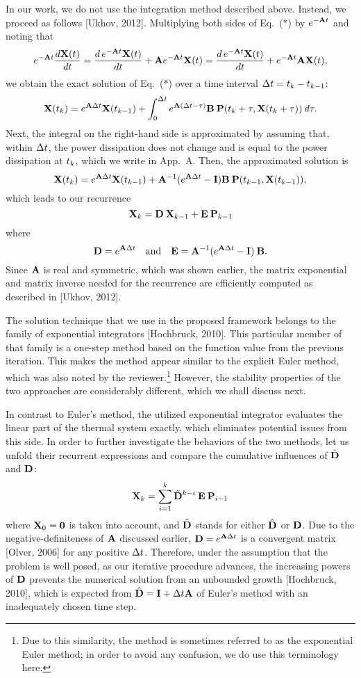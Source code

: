 \begin{authors}
In our work, we do not use the integration method described above.
Instead, we proceed as follows [Ukhov, 2012].
Multiplying both sides of Eq.~($\ast$) by $e^{- \mA \t}$ and noting that
\[
  e^{-\mA \t} \frac{d\vX(\t)}{d\t} = \frac{d\, e^{-\mA \t} \vX(\t)}{d\t} + \mA e^{-\mA \t} \vX(\t) = \frac{d\, e^{-\mA \t} \vX(\t)}{d\t} + e^{-\mA \t} \mA \vX(\t),
\]
we obtain the exact solution of Eq.~($\ast$) over a time interval $\Delta t = t_k - t_{k - 1}$:
\[
  \vX(\t_k) = e^{\mA \Delta \t} \vX(\t_{k - 1}) + \int_0^{\Delta \t} e^{\mA (\Delta t - \tau)} \mB \: \vP(\t_k + \tau, \vX(\t_k + \tau)) \: d\tau.
\]
Next, the integral on the right-hand side is approximated by assuming that, within $\Delta t$, the power dissipation does not change and is equal to the power dissipation at $t_k$, which we write in App.~A.
Then, the approximated solution is
\[
  \vX(\t_k) = e^{\mA \Delta \t} \vX(\t_{k - 1}) + \mA^{-1}(e^{\mA \Delta \t} - \mI) \mB \: \vP(\t_{k - 1}, \vX(\t_{k - 1})),
\]
which leads to our recurrence
\[
  \vX_k = \mCF \: \vX_{k - 1} + \mCS \: \vP_{k - 1}
\]
where
\[
  \mCF = e^{\mA \Delta t} \hspace{1em} \text{and} \hspace{1em} \mCS = \mA^{-1} (e^{\mA \Delta \t} - \mI) \: \mB.
\]
Since $\mA$ is real and symmetric, which was shown earlier, the matrix exponential and matrix inverse needed for the recurrence are efficiently computed as described in [Ukhov, 2012].

The solution technique that we use in the proposed framework belongs to the family of exponential integrators [Hochbruck, 2010].
This particular member of that family is a one-step method based on the function value from the previous iteration.
This makes the method appear similar to the explicit Euler method, which was also noted by the reviewer.\footnote{Due to this similarity, the method is sometimes referred to as the exponential Euler method; in order to avoid any confusion, we do use this terminology here.}
However, the stability properties of the two approaches are considerably different, which we shall discuss next.

In contrast to Euler's method, the utilized exponential integrator evaluates the linear part of the thermal system exactly, which eliminates potential issues from this side.
In order to further investigate the behaviors of the two methods, let us unfold their recurrent expressions and compare the cumulative influences of $\hat{\mCF}$ and $\mCF$:
\[
  \vX_k = \sum_{i = 1}^k \tilde{\mCF}^{k - i} \: \mCS \: \vP_{i - 1}
\]
where $\vX_0 = \mZero$ is taken into account, and $\tilde{\mCF}$ stands for either $\hat{\mCF}$ or $\mCF$.
Due to the negative-definiteness of $\mA$ discussed earlier, $\mCF = e^{\mA \Delta \t}$ is a convergent matrix [Olver, 2006] for any positive $\Delta t$.
Therefore, under the assumption that the problem is well posed, as our iterative procedure advances, the increasing powers of $\mCF$ prevents the numerical solution from an unbounded growth [Hochbruck, 2010], which is expected from $\hat{\mCF} = \mI + \Delta \t \mA$ of Euler's method with an inadequately chosen time step.


\end{authors}
